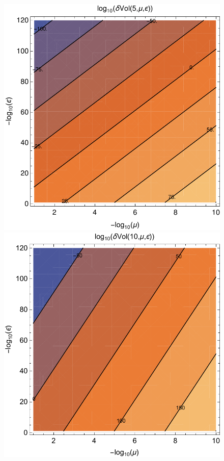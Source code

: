 \documentclass[a4paper,11pt]{article}
\begin{document}
\begin{figure}
\includegraphics[scale=.6]{dvolk5}
\includegraphics[scale=.6]{dvolk10} \\

\end{figure}
\end{document}
